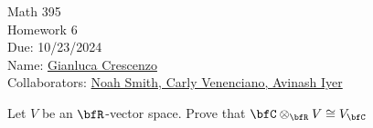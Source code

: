 \documentclass[10pt,twoside,openany]{memoir}
\begin{document}
\begin{center}
    { \Large Math 395 \\[0.1in]Homework 6 \\[0.1in]
    Due: 10/23/2024}\\[.25in]
    { Name:} {\underline{Gianluca Crescenzo\hspace*{2in}}}\\[0.15in]
    { Collaborators:} {\underline{Noah Smith, Carly Venenciano, Avinash Iyer\hspace*{2in}}} \\
    \end{center}
    \vspace{4pt}
    \begin{exercise}
        Let $V$ be an $\bfR$-vector space. Prove that $\bfC \otimes_\bfR V \cong V_\bfC$
    \end{exercise}
\end{document}
